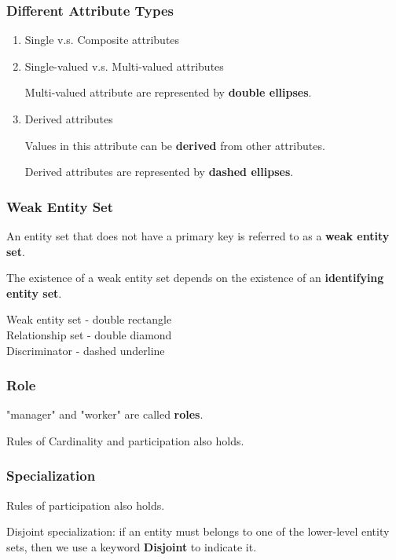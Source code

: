\documentclass[11pt,a4paper]{article}
\begin{document}
\subsubsection{Different Attribute Types}
\begin{enumerate}
    \item [1.] Single v.s. Composite attributes

    \item [2.] Single-valued v.s. Multi-valued attributes \par
        Multi-valued attribute are represented by \textbf{double ellipses}.

    \item[3.] Derived attributes \par
        Values in this attribute can be \textbf{derived} from other attributes. \par
        Derived attributes are represented by \textbf{dashed ellipses}.
\end{enumerate}

\subsubsection{Weak Entity Set}
An entity set that does not have a primary key is referred to as a \textbf{weak entity set}. \par
The existence of a weak entity set depends on the existence of an \textbf{identifying entity set}. \par
{}
Weak entity set - double rectangle \\
Relationship set - double diamond \\
Discriminator - dashed underline \par

\subsubsection{Role}
"manager" and "worker" are called \textbf{roles}. \par
Rules of Cardinality and participation also holds. \par

\subsubsection{Specialization}
Rules of participation also holds. \par
Disjoint specialization: if an entity must belongs to one of the lower-level entity sets, then we use a keyword \textbf{Disjoint} to indicate it. \par
\end{document}

